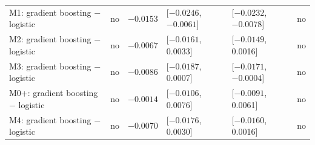 \documentclass[11pt]{article}
\begin{document}
\begin{landscape}
{\begin{longtable}{L{6.5cm}R{1.5cm}R{1.8cm}R{3.6cm}R{3.6cm}R{2.4cm}}
M1: gradient boosting $-$ logistic & no & $-0.0153$ & [$-0.0246$, $-0.0061$] & [$-0.0232$, $-0.0078$] & no \\
M2: gradient boosting $-$ logistic & no & $-0.0067$ & [$-0.0161$, 0.0033] & [$-0.0149$, 0.0016] & no \\
M3: gradient boosting $-$ logistic & no & $-0.0086$ & [$-0.0187$, 0.0007] & [$-0.0171$, $-0.0004$] & no \\
M0+: gradient boosting $-$ logistic & no & $-0.0014$ & [$-0.0106$, 0.0076] & [$-0.0091$, 0.0061] & no \\
M4: gradient boosting $-$ logistic & no & $-0.0070$ & [$-0.0176$, 0.0030] & [$-0.0160$, 0.0016] & no \\
\end{longtable}
}
\end{landscape}
\end{document}
